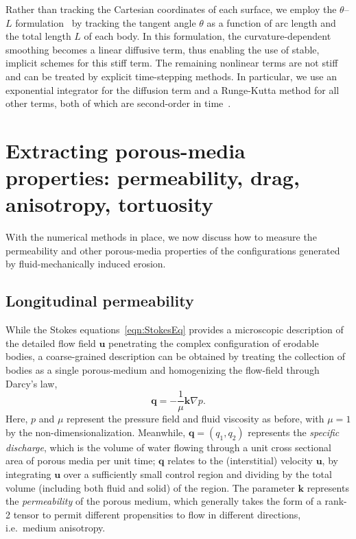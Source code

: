\documentclass[3p]{elsarticle}
\newcommand{\grad}{{\nabla}}
\newcommand{\uu}{{\mathbf{u}}}
\newcommand{\thL}{$\theta$--$L$}
\newcommand{\bvec}[1]{\mathbf{#1}}
\newcommand {\bq} {\bvec{q}}
\begin{document}
Rather than tracking the Cartesian coordinates of each surface, we employ the {\thL} formulation~\cite{hou-low-she1994, Moore2013, MooreCPAM2017, mac2022morphological} by tracking the tangent angle $\theta$ as a function of arc length and the total length $L$ of each body. In this formulation, the curvature-dependent smoothing becomes a linear diffusive term, thus enabling the use of stable, implicit schemes for this stiff term. The remaining nonlinear terms are not stiff and can be treated by explicit time-stepping methods. In particular, we use an exponential integrator for the diffusion term and a Runge-Kutta method for all other terms, both of which are second-order in time~\cite{quaife2018boundary}.


\section{Extracting porous-media properties: permeability, drag, anisotropy, tortuosity}
\label{sec:medium}

With the numerical methods in place, we now discuss how to measure the permeability and other porous-media properties of the configurations generated by fluid-mechanically induced erosion.

\subsection{Longitudinal permeability}
\label{LongPerm}

While the Stokes equations~\eqref{eqn:StokesEq} provides a microscopic description of the detailed flow field $\uu$ penetrating the complex configuration of erodable bodies, a coarse-grained description can be obtained by treating the collection of bodies as a single porous-medium and homogenizing the flow-field through Darcy's law,
\begin{equation}
  \label{eqn:Darcy}
  \bq = - \frac{1}{\mu} \bvec{k} \grad p.
\end{equation}
Here, $p$ and $\mu$ represent the pressure field and fluid viscosity as before, with $\mu = 1$ by the non-dimensionalization. Meanwhile, $\bq = (q_1, q_2)$ represents the {\em specific discharge}, which is the volume of water flowing through a unit cross sectional area of porous media per unit time; $\bq$ relates to the (interstitial) velocity $\uu$, by integrating $\uu$ over a sufficiently small control region and dividing by the total volume (including both fluid and solid) of the region. The parameter $\bvec{k}$ represents the {\em permeability} of the porous medium, which generally takes the form of a rank-2 tensor to permit different propensities to flow in different directions, i.e.~medium anisotropy.  
\end{document}
